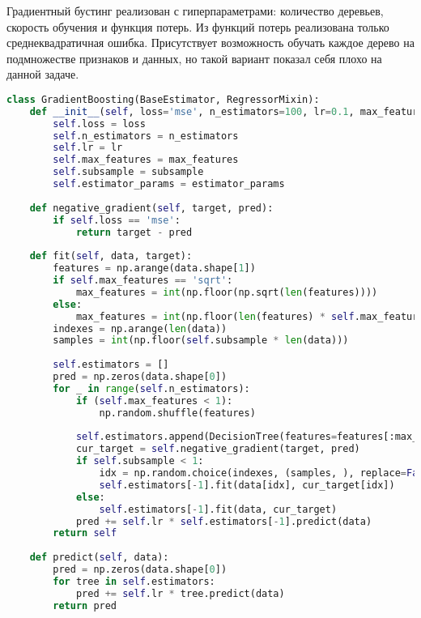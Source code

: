 Градиентный бустинг реализован с гиперпараметрами: количество деревьев, скорость обучения и функция потерь. Из функций потерь реализована только среднеквадратичная ошибка. Присутствует возможность обучать каждое дерево на подмножестве признаков и данных, но такой вариант показал себя плохо на данной задаче.
\begin{lstlisting}[language=python, keepspaces=true]
class GradientBoosting(BaseEstimator, RegressorMixin):
    def __init__(self, loss='mse', n_estimators=100, lr=0.1, max_features=1, subsample=1, **estimator_params):
        self.loss = loss
        self.n_estimators = n_estimators
        self.lr = lr
        self.max_features = max_features
        self.subsample = subsample
        self.estimator_params = estimator_params
        
    def negative_gradient(self, target, pred):
        if self.loss == 'mse':
            return target - pred
    
    def fit(self, data, target):
        features = np.arange(data.shape[1])
        if self.max_features == 'sqrt':
            max_features = int(np.floor(np.sqrt(len(features))))
        else:
            max_features = int(np.floor(len(features) * self.max_features))
        indexes = np.arange(len(data))
        samples = int(np.floor(self.subsample * len(data)))
        
        self.estimators = []
        pred = np.zeros(data.shape[0])
        for _ in range(self.n_estimators):
            if (self.max_features < 1):
                np.random.shuffle(features)
                
            self.estimators.append(DecisionTree(features=features[:max_features], **self.estimator_params))
            cur_target = self.negative_gradient(target, pred)
            if self.subsample < 1:
                idx = np.random.choice(indexes, (samples, ), replace=False)
                self.estimators[-1].fit(data[idx], cur_target[idx])
            else:
                self.estimators[-1].fit(data, cur_target)
            pred += self.lr * self.estimators[-1].predict(data)
        return self
    
    def predict(self, data):
        pred = np.zeros(data.shape[0])
        for tree in self.estimators:
            pred += self.lr * tree.predict(data)
        return pred
\end{lstlisting}

\pagebreak
